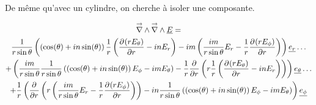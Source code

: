     De même qu'avec un cylindre, on cherche à isoler une composante.

    \begin{multline}
        \vrot \vrot \v{E} = \\
        \frac{1}{r\sin\theta}\left(\left(\cos(\theta) + in\sin(\theta)\right)\frac{1}{r}\left(\ddr{r}{(rE_\theta)}-inE_r\right) - im \left(\frac{im}{r\sin\theta}E_r - \frac{1}{r}\ddr{r}{(rE_\phi)} \right)\right)\v{e_r}\dots 
        \\
        + \left(\frac{im}{r\sin\theta}\frac{1}{r\sin\theta}\left(\left(\cos(\theta) + in\sin(\theta)\right)E_\phi - im E_\theta\right) - \frac{1}{r}\ddr{r}{}\left(r \frac{1}{r}\left(\ddr{r}{(rE_\theta)}-inE_r\right)\right) \right)\v{e_\theta} \dots
        \\
        + \frac{1}{r}\left(\ddr{r}{}\left(r \left(\frac{im}{r\sin\theta}E_r - \frac{1}{r}\ddr{r}{(rE_\phi)} \right)\right)-in\frac{1}{r\sin\theta}\left(\left(\cos(\theta) + in\sin(\theta)\right)E_\phi - im E_\theta\right)\right)\v{e_\phi}
    \end{multline}
